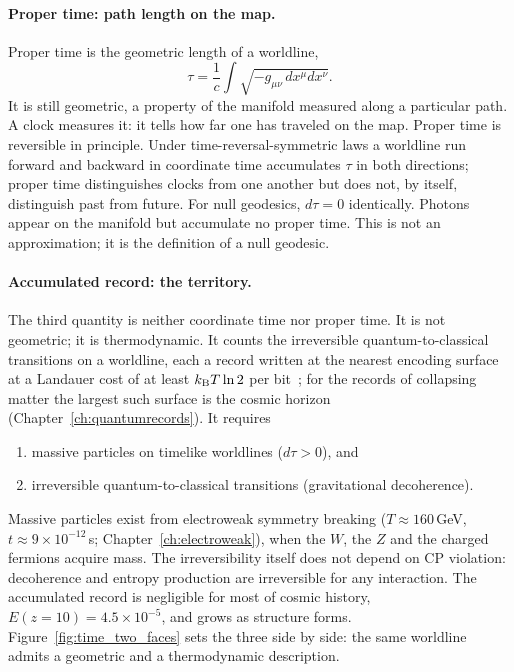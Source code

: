 \paragraph{Proper time: path length on the map.} Proper time is the geometric length of a worldline,
\begin{equation}
\tau=\frac1c\int\sqrt{-g_{\mu\nu}\,dx^\mu dx^\nu}.\label{eq:time_tau}
\end{equation}
It is still geometric, a property of the manifold measured along a particular path. A clock measures it: it tells how far one has traveled on the map.
Proper time is reversible in principle. Under time-reversal-symmetric laws a worldline run forward and backward in coordinate time accumulates $\tau$ in
both directions; proper time distinguishes clocks from one another but does not, by itself, distinguish past from future. For null geodesics,
$d\tau=0$ identically. Photons appear on the manifold but accumulate no proper time. This is not an approximation; it is the definition of a null
geodesic. \derived

\paragraph{Accumulated record: the territory.} The third quantity is neither coordinate time nor proper time. It is not geometric; it is
thermodynamic. It counts the irreversible quantum-to-classical transitions on a worldline, each a record written at the nearest encoding surface at a
Landauer cost of at least $k_{\mathrm B} T\ln2$ per bit~\cite{Landauer1961}; for the records of collapsing matter the largest such surface is the cosmic horizon
(Chapter~\ref{ch:quantumrecords}). It requires
\begin{enumerate}
\item massive particles on timelike worldlines ($d\tau>0$), and
\item irreversible quantum-to-classical transitions (gravitational decoherence).
\end{enumerate}
Massive particles exist from electroweak symmetry breaking ($T\approx160$\,GeV, $t\approx9\times10^{-12}$\,s; Chapter~\ref{ch:electroweak}), when the $W$, the
$Z$ and the charged fermions acquire mass. The irreversibility itself does not depend on CP violation: decoherence and entropy production are
irreversible for any interaction. The accumulated record is negligible for most of cosmic history, $E(z{=}10)=4.5\times10^{-5}$, and grows as structure
forms. \calc{} Figure~\ref{fig:time_two_faces} sets the three side by side: the same worldline admits a geometric and a thermodynamic description.

